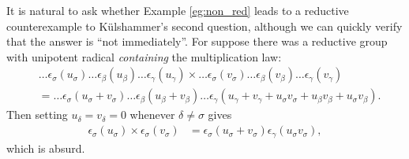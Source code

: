 It is natural to ask whether Example \ref{eg:non_red} leads to a reductive counterexample to K\"ulshammer's second question, although we can quickly verify that the answer is ``not immediately''. For suppose there was a reductive group with unipotent radical \emph{containing} the multiplication law:
\begin{align*}
	&\ldots \epsilon_\sigma(u_\sigma) \ldots \epsilon_\beta(u_\beta) \ldots \epsilon_\gamma(u_\gamma) \times
	\ldots \epsilon_\sigma(v_\sigma) \ldots \epsilon_\beta(v_\beta) \ldots \epsilon_\gamma(v_\gamma)\\
	&=
	\ldots \epsilon_\sigma(u_\sigma + v_\sigma) \ldots \epsilon_\beta(u_\beta + v_\beta) \ldots \epsilon_\gamma(u_\gamma + v_\gamma + u_\sigma v_\sigma + u_\beta v_\beta + u_\sigma v_\beta).
\end{align*}
Then setting $u_\delta = v_\delta = 0$ whenever $\delta \neq \sigma$ gives
\begin{align*}
	\epsilon_\sigma(u_\sigma) \times \epsilon_\sigma(v_\sigma) &= \epsilon_\sigma(u_\sigma + v_\sigma) \epsilon_\gamma(u_\sigma v_\sigma),
\end{align*}
which is absurd.



